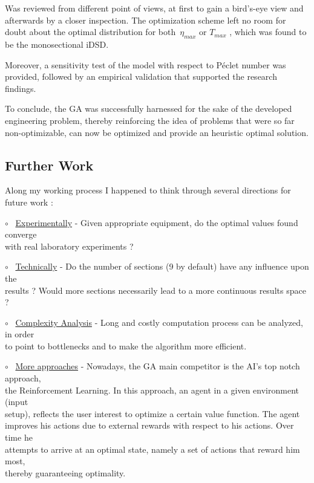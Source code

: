 \documentclass[12pt]{article}
\numberwithin{equation}{section}
\begin{document}
\begin{flushleft}
Was reviewed from different point of views, at first to gain a bird's-eye view and afterwards by a closer inspection. The optimization scheme left no room for doubt about the optimal distribution for both \,$\eta_{max}$  or  $T_{max}$ , which was found to be the monosectional iDSD. 

Moreover, a sensitivity test of the model with respect to Péclet number was provided, followed by an empirical validation that supported the research findings.

To conclude, the GA was successfully harnessed for the sake of the developed engineering problem, thereby reinforcing the idea of problems that were so far non-optimizable, can now be optimized and provide an heuristic optimal solution.

\subsection{Further Work}

Along my working process I happened to think through several directions for future work :

\quad $\circ$ \ \underline{Experimentally} - Given appropriate equipment, do the optimal values found converge  \\ \hspace{8mm} with real laboratory experiments ?

\quad $\circ$ \ \underline{Technically} - Do the number of sections (9 by default) have any influence upon the \\ \hspace{8mm} results ? Would more sections necessarily lead to a more continuous results space ?

\quad $\circ$ \ \underline{Complexity Analysis} - Long and costly computation process can be analyzed, in order  \\ \hspace{8mm} to point to bottlenecks and to make the algorithm more efficient.

\quad $\circ$ \ \underline{More approaches} - Nowadays, the GA main competitor is the AI's top notch approach,  \\ \hspace{8mm} the Reinforcement Learning. In this approach, an agent in a given environment (input  \\ \hspace{8mm} setup), reflects the user interest to optimize a certain value function. The agent  \\ \hspace{8mm} improves his actions due to external rewards with respect to his actions. Over time he \\ \hspace{8mm} attempts to arrive at an optimal state, namely a set of actions that reward him most, \\ \hspace{8mm} thereby guaranteeing optimality.


\end{flushleft}
\end{document}
